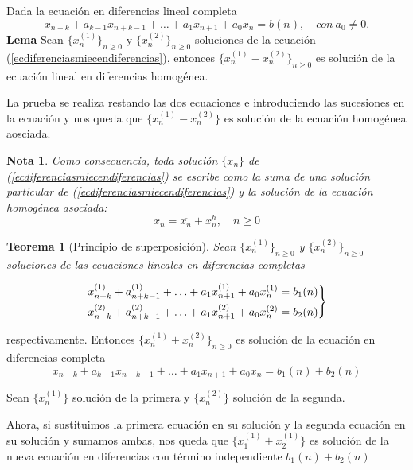 \documentclass[11pt, a4paper]{article}
\makeatletter
\newif\IfInSansMode
\let\oldsf\sffamily
\renewcommand*{\sffamily}{\oldsf\mathversion{sans}\InSansModetrue}
\let\oldnorm\normalfont
\renewcommand*{\normalfont}{\oldnorm\InSansModefalse\mathversion{normal}}
\renewenvironment{proof}[1][\proofname] {\vspace{-15pt}\par\pushQED{\qed}\normalfont\topsep6\p@\@plus6\p@\relax\trivlist\item[\hskip\labelsep\it#1\@addpunct{.}]\ignorespaces}{\popQED\endtrivlist\@endpefalse}
\numberwithin{equation}{section}
\renewenvironment{proof}[1][\proofname] {\par\pushQED{\qed}\normalfont\topsep6\p@\@plus6\p@\relax\trivlist\item[\hskip\labelsep\itshape\sffamily#1\@addpunct{.}]\ignorespaces}{\popQED\endtrivlist\@endpefalse}
\theoremstyle{theorem-style}
\newtheorem{nth}{Teorema}[section]
\theoremstyle{definition-style}
\theoremstyle{remark-style}
\newtheorem*{nota}{Nota}
\theoremstyle{example-style}
\newenvironment{rcases}
  {\left.\begin{aligned}}
  {\end{aligned}\right\rbrace}
\makeatother
\begin{document}
     Dada la ecuación en diferencias lineal completa
     \begin{equation} \label{ecdiferenciasmiecendiferencias}
      x_{n+k} + a_{k-1}x_{n+k-1} + \hdots + a_{1}x_{n+1} + a_{0}x_{n} = b(n), \quad 
      con\ a_{0} \neq 0.
\end{equation}
      \textbf{Lema}
      Sean $\{x_{n}^{(1)}\}_{n \geq 0}$ y $\{x_{n}^{(2)}\}_{n \geq 0}$ soluciones de
      la ecuación (\ref {ecdiferenciasmiecendiferencias}), entonces
      $\{x_{n}^{(1)} - x_{n}^{(2)}\}_{n \geq 0}$ es solución de la ecuación lineal
      en diferencias homogénea.\\

\begin{proof}
	La prueba se realiza restando las dos ecuaciones e introduciendo las sucesiones en la ecuación y nos queda que $\{x_n^{(1)}-x_n^{(2)}\}$ es solución de la ecuación homogénea aosciada.
\end{proof}

\begin{nota}
	Como consecuencia, toda solución $\{x_n\}$ de (\ref{ecdiferenciasmiecendiferencias}) se escribe como la suma de una solución particular de (\ref{ecdiferenciasmiecendiferencias}) y la solución de la ecuación homogénea asociada: $$x_n = \overline{x_n} + x_n^h, \quad n \ge 0$$
\end{nota}


      \begin{nth}[Principio de superposición]
        Sean $\{x_{n}^{(1)}\}_{n\geq0}$ y $\{x_{n}^{(2)}\}_{n\geq0}$ soluciones de
        las ecuaciones lineales en diferencias completas 
      \end{nth}

       $$
        \begin{rcases}
         x_{n+k}^{(1)} + a_{n+k-1}^{(1)} + \hdots + a_{1}x_{n+1}^{(1)} +
         a_{0}x_{n}^{(1)} = b_{1}(n) \\
         x_{n+k}^{(2)} + a_{n+k-1}^{(2)} + \hdots + a_{1}x_{n+1}^{(2)} +
         a_{0}x_{n}^{(2)} = b_{2}(n) \\
        \end{rcases}
        $$

        respectivamente. Entonces $\{x_{n}^{(1)}+ x_{n}^{(2)}\}_{n \geq 0}$ es
        solución de la ecuación en diferencias completa
           $$x_{n+k} + a_{k-1}x_{n+k-1} + \hdots + a_{1}x_{n+1} + a_{0}x_{n} =
        b_{1}(n) + b_{2}(n)$$


\begin{proof}
	Sean $\{x_n^{(1)}\}$ solución de la primera y $\{ x_n^{(2)}\}$ solución de la segunda.

Ahora, si sustituimos la primera ecuación en su solución y la segunda ecuación en su solución y sumamos ambas, nos queda que $\{x_1^{(1)} + x_2^{(1)}\}$ es solución de la nueva ecuación en diferencias con término independiente $b_1(n)+b_2(n)$
\end{proof}
\end{document}
